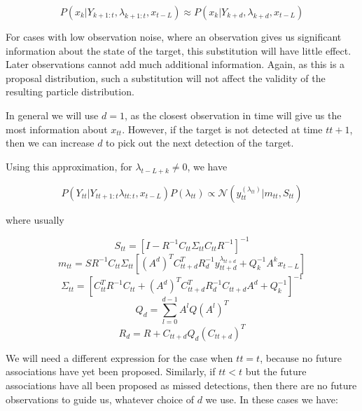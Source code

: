 \begin{equation}
P(x_k|Y_{k+1:t}, \lambda_{k+1:t}, x_{t-L}) \approx P(x_k|Y_{k+d}, \lambda_{k+d}, x_{t-L})
\label{eq:}
\end{equation}

For cases with low observation noise, where an observation gives us significant information about the state of the target, this substitution will have little effect. Later observations cannot add much additional information. Again, as this is a proposal distribution, such a substitution will not affect the validity of the resulting particle distribution.

In general we will use $d=1$, as the closest observation in time will give us the most information about $x_{tt}$. However, if the target is not detected at time $tt+1$, then we can increase $d$ to pick out the next detection of the target.

Using this approximation, for $\lambda_{t-L+k} \ne 0$, we have

\begin{equation}
P(Y_{tt}|Y_{tt+1:t} \lambda_{tt:t}, x_{t-L}) P(\lambda_{tt}) \propto \mathcal{N}(y_{tt}^{(\lambda_{tt})}|m_{tt}, S_{tt})
\end{equation}

where usually

\begin{equation} S_{tt} = [ I - R^{-1} C_{tt} \Sigma_{tt} C_{tt} R^{-1} ]^{-1} \label{eq:} \end{equation}
\begin{equation} m_{tt} = S R^{-1} C_{tt} \Sigma_{tt} [ (A^d)^T C_{tt+d}^T R_d^{-1} y_{tt+d}^{\lambda_{tt+d}} + Q_k^{-1} A^k x_{t-L} ] \label{eq:} \end{equation}
\begin{equation} \Sigma_{tt} = [ C_{tt}^T R^{-1} C_{tt} + (A^d)^T C_{tt+d}^T R_d^{-1} C_{tt+d} A^d + Q_k^{-1}]^{-1} \label{eq:} \end{equation}
\begin{equation} Q_d = \sum_{l=0}^{d-1} {A^l Q (A^l)^T} \label{eq:} \end{equation}
\begin{equation} R_d = R + C_{tt+d} Q_d (C_{tt+d})^T \label{eq:} \end{equation}

We will need a different expression for the case when $tt=t$, because no future associations have yet been proposed. Similarly, if $tt<t$ but the future associations have all been proposed as missed detections, then there are no future observations to guide us, whatever choice of $d$ we use. In these cases we have:

